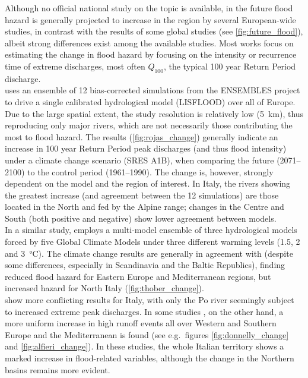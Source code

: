 Although no official national study on the topic is available, in the future flood hazard is generally projected to increase in the region by several European-wide studies, in contrast with the results of some global studies (see \cref{fig:future_flood}), albeit strong differences exist among the available studies. Most works focus on estimating the change in flood hazard by focusing on the intensity or recurrence time of extreme discharges, most often $Q_{100}$, the typical 100 year Return Period discharge.\\
 uses an ensemble of 12 bias-corrected simulations from the ENSEMBLES project to drive a single calibrated hydrological model (LISFLOOD) over all of Europe. Due to the large spatial extent, the study resolution is relatively low (\SI{5}{\kilo \metre}), thus reproducing only major rivers, which are not necessarily those contributing the most to flood hazard.
The results (\cref{fig:rojas_change}) generally indicate an increase in 100 year Return Period peak discharges (and thus flood intensity) under a climate change scenario (SRES A1B), when comparing the future (2071--2100) to the control period (1961--1990).
The change is, however, strongly dependent on the model and the region of interest.
In Italy, the rivers showing the greatest increase (and agreement between the 12 simulations) are those located in the North and fed by the Alpine range; changes in the Centre and South (both positive and negative) show lower agreement between models.\\
In a similar study, \citet{Thober2018} employs a multi-model ensemble of three hydrological models forced by five Global Climate Models under three different warming levels (1.5, 2 and \SI{3}{\celsius}). The climate change results are generally in agreement with \citep{Rojas2012} (despite some differences, especially in Scandinavia and the Baltic Republics), finding reduced flood hazard for Eastern Europe and Mediterranean regions, but increased hazard for North Italy (\cref{fig:thober_change}).\\
\citet{Feyen2012, Dankers2009} show more conflicting results for Italy, with only the Po river seemingly subject to increased extreme peak discharges. In some studies \citep{Roudier2016, Donnelly2017, Alfieri2015, Alfieri2015a}, on the other hand, a more uniform increase in high runoff events all over Western and Southern Europe and the Mediterranean is found (see e.g.\ figures \ref{fig:donnelly_change} and \ref{fig:alfieri_change}). In these studies, the whole Italian territory shows a marked increase in flood-related variables, although the change in the Northern basins remains more evident.

